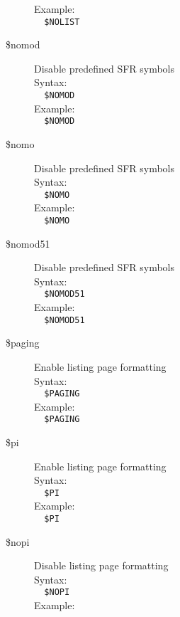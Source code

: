 \documentclass[a4paper,twoside,12pt]{book}
\begin{document}
\begin{description}
				Example:\\
				\verb'  '{\color{highlight_control}\verb'$NOLIST'}\\
			\item[\$nomod] Disable predefined SFR symbols\\
				Syntax:\\
				\verb'  '{\color{highlight_control}\verb'$NOMOD'}\\
				Example:\\
				\verb'  '{\color{highlight_control}\verb'$NOMOD'}\\
			\item[\$nomo] Disable predefined SFR symbols\\
				Syntax:\\
				\verb'  '{\color{highlight_control}\verb'$NOMO'}\\
				Example:\\
				\verb'  '{\color{highlight_control}\verb'$NOMO'}\\
			\item[\$nomod51] Disable predefined SFR symbols\\
				Syntax:\\
				\verb'  '{\color{highlight_control}\verb'$NOMOD51'}\\
				Example:\\
				\verb'  '{\color{highlight_control}\verb'$NOMOD51'}\\
			\item[\$paging] Enable listing page formatting\\
				Syntax:\\
				\verb'  '{\color{highlight_control}\verb'$PAGING'}\\
				Example:\\
				\verb'  '{\color{highlight_control}\verb'$PAGING'}\\
			\item[\$pi] Enable listing page formatting\\
				Syntax:\\
				\verb'  '{\color{highlight_control}\verb'$PI'}\\
				Example:\\
				\verb'  '{\color{highlight_control}\verb'$PI'}\\
			\item[\$nopi] Disable listing page formatting\\
				Syntax:\\
				\verb'  '{\color{highlight_control}\verb'$NOPI'}\\
				Example:\\

\end{description}
\end{document}
